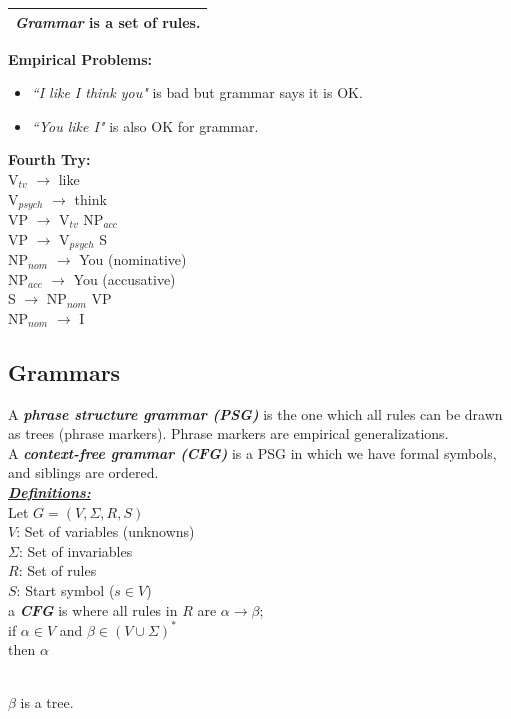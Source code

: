 \documentclass[12pt,a4paper]{article}
\begin{document}
\begin{table}[H]
\begin{tabular}{c}
\hline 
\emph{\textbf{Grammar}} is a set of rules. \\ 
\hline 
\end{tabular} 
\end{table}

\textbf{Empirical Problems:}
\begin{itemize}
\item \textit{``I like I think you"} is bad but grammar says it is OK.
\item \textit{``You like I"} is also OK for grammar.
\end{itemize}

\textbf{Fourth Try:}\\
V$_{tv}$ $\rightarrow$ like\\
V$_{psych}$ $\rightarrow$ think\\
VP $\rightarrow$ V$_{tv}$ NP$_{acc}$ \\
VP $\rightarrow$ V$_{psych}$ S\\
NP$_{nom}$ $\rightarrow$ You (nominative)\\
NP$_{acc}$ $\rightarrow$ You (accusative)\\
S $\rightarrow$ NP$_{nom}$ VP\\
NP$_{nom}$ $\rightarrow$ I

\subsection{Grammars}
A \emph{\textbf{phrase structure grammar (PSG)}} is the one which all rules can be drawn as trees (phrase markers). Phrase markers are empirical generalizations.\\
\noindent A \emph{\textbf{context-free grammar (CFG)}} is a PSG in which we have formal symbols, and siblings are ordered.\\

\emph{\underline{\textbf{Definitions:}}}\\

Let $G=(V, \Sigma, R, S)$\\
$V$: Set of variables (unknowns)\\
$\Sigma$: Set of invariables \\
$R$: Set of rules\\
$S$: Start symbol ($s \in V$)\\

\noindent a \textbf{\emph{CFG}} is where all rules in $R$ are $\alpha \rightarrow \beta$;\\
if $\alpha \in V$ and $\beta \in (V \cup \Sigma)^{\ast}$\\
then $\alpha$\\
\\
\indent $\beta$ is a tree.
\end{document}
